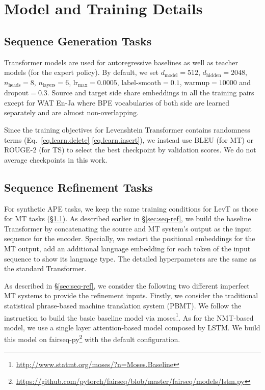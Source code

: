 \documentclass{article}
\newcommand{\secref}[1]{\S\ref{#1}}
\begin{document}
\section{Model and Training Details}
\subsection{Sequence Generation Tasks}
\label{apx.gen}
Transformer models are used for autoregressive baselines as well as teacher models (for the expert policy). By default, we set $d_\text{model}=512$, $d_\text{hidden}=2048$, $n_\text{heads}=8$, $n_\text{layers}=6$, $\text{lr}_{\max}=0.0005$, $\text{label-smooth}=0.1$, $\text{warmup}=10000$ and $\text{dropout}=0.3$. Source and target side share embeddings in all the training pairs except for WAT En-Ja where BPE vocabularies of both side are learned separately and are almost non-overlapping. 

Since the training objectives for Levenshtein Transformer contains randomness terms (Eq.~\eqref{eq.learn.delete} \eqref{eq.learn.insert}), we instead use BLEU (for MT) or ROUGE-2 (for TS) to select the best checkpoint by validation scores. We do not average checkpoints in this work.

\subsection{Sequence Refinement Tasks}
For synthetic APE tasks, we keep the same training conditions for LevT as those for MT tasks (\secref{apx.gen}). 
As described earlier in \secref{sec:seq-ref}, we build the baseline Transformer by concatenating
the source and MT system’s output as the input sequence for the encoder. Specially, we restart the
positional embeddings for the MT output, add an additional language embedding for each token of the input sequence to show its language type. The detailed hyperpameters are the same as the
standard Transformer.

As described in \secref{sec:seq-ref}, we consider the following two different imperfect MT systems to provide the
refinement inputs. Firstly, we consider the traditional statistical phrase-based machine translation
system (PBMT). We follow the instruction to build the basic baseline model via moses\footnote{\url{http://www.statmt.org/moses/?n=Moses.Baseline}}. 
As for the NMT-based model, we use a single layer attention-based model composed by LSTM. We build this
model on fairseq-py\footnote{\url{https://github.com/pytorch/fairseq/blob/master/fairseq/models/lstm.py}} with the default configuration.
\end{document}
